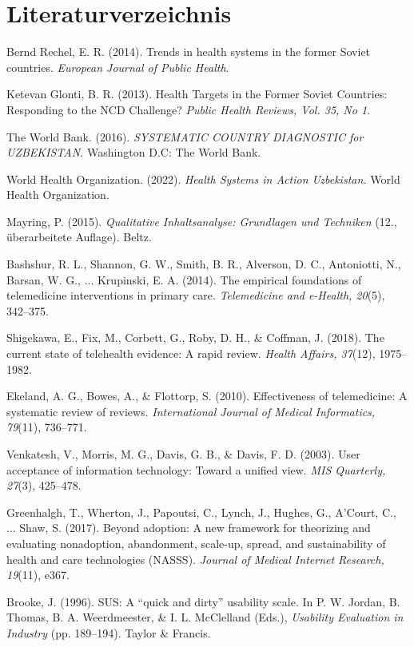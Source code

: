\chapter{Literaturverzeichnis}

Bernd Rechel, E. R. (2014). Trends in health systems in the former
Soviet countries. \emph{European Journal of Public Health}.

Ketevan Glonti, B. R. (2013). Health Targets in the Former Soviet
Countries: Responding to the NCD Challenge? \emph{Public Health Reviews,
Vol. 35, No 1}.

The World Bank. (2016). \emph{SYSTEMATIC COUNTRY DIAGNOSTIC for
UZBEKISTAN.} Washington D.C: The World Bank.

World Health Organization. (2022). \emph{Health Systems in Action
Uzbekistan.} World Health Organization.

Mayring, P. (2015). \emph{Qualitative Inhaltsanalyse: Grundlagen und Techniken}
(12., überarbeitete Auflage). Beltz.

Bashshur, R. L., Shannon, G. W., Smith, B. R., Alverson, D. C.,
Antoniotti, N., Barsan, W. G., ... Krupinski, E. A. (2014). The
empirical foundations of telemedicine interventions in primary care.
\emph{Telemedicine and e-Health, 20}(5), 342--375.

Shigekawa, E., Fix, M., Corbett, G., Roby, D. H., \& Coffman, J.
(2018). The current state of telehealth evidence: A rapid review.
\emph{Health Affairs, 37}(12), 1975--1982.

Ekeland, A. G., Bowes, A., \& Flottorp, S. (2010). Effectiveness of
telemedicine: A systematic review of reviews. \emph{International Journal
of Medical Informatics, 79}(11), 736--771.

Venkatesh, V., Morris, M. G., Davis, G. B., \& Davis, F. D. (2003).
User acceptance of information technology: Toward a unified view.
\emph{MIS Quarterly, 27}(3), 425--478.

Greenhalgh, T., Wherton, J., Papoutsi, C., Lynch, J., Hughes, G.,
A'Court, C., ... Shaw, S. (2017). Beyond adoption: A new framework for
theorizing and evaluating nonadoption, abandonment, scale-up, spread, and
sustainability of health and care technologies (NASSS). \emph{Journal of
Medical Internet Research, 19}(11), e367.

Brooke, J. (1996). SUS: A ``quick and dirty'' usability scale. In
P. W. Jordan, B. Thomas, B. A. Weerdmeester, \& I. L. McClelland
(Eds.), \emph{Usability Evaluation in Industry} (pp. 189--194).
Taylor \& Francis.

